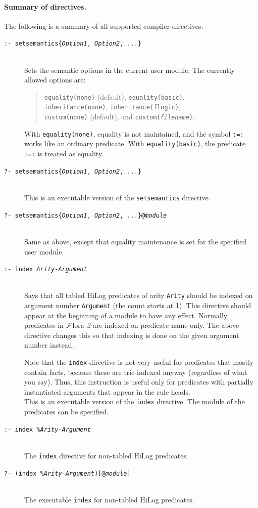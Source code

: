 \documentclass[11pt]{article}
\newcommand{\FLORA}{{\mbox{\sc ${\cal F}${lora}\rm\emph{-2}}}\xspace}
\begin{document}
\paragraph{Summary of directives.}
The following is a summary of all supported compiler directives:
\begin{description}
  \item[{\tt :- setsemantics\{\emph{Option1}, \emph{Option2}, ...\}}]
%
~~~\\
Sets the semantic options in the current user module.  The currently allowed
options are:
\begin{quote}
{\tt equality(none)} (default), {\tt equality(basic)},\\
{\tt inheritance(none)}, {\tt inheritance(flogic)},\\
{\tt custom(none)} (default), and {\tt custom(\emph{filename})}.
\end{quote}
  With {\tt equality(none)}, equality is not
maintained, and the symbol {\tt :=:} works like an ordinary predicate.
With {\tt equality(basic)}, the predicate {\tt :=:} is treated as equality.
\item[{\tt ?- setsemantics\{\emph{Option1}, \emph{Option2}, ...\}}]
  ~~~\\
  This is an executable version of the {\tt setsemantics} directive.
\item[{\tt ?- setsemantics\{\emph{Option1}, \emph{Option2}, ...\}@\emph{module}}]
  ~~~\\
  Same as above, except that equality maintenance is set for the specified
  user module.
  
\item[{\tt :- index \emph{Arity-Argument} }]
  ~~~\\
  Says that all tabled HiLog predicates of arity {\tt Arity} should be indexed on
  argument number {\tt Argument} (the count starts at 1). This directive
  should appear at the beginning of a module to have any effect.
  Normally predicates in \FLORA are indexed on predicate name only.
  The  above directive changes this so that indexing is done on the given
  argument number instead.

  Note that the {\tt index} directive is not very useful for predicates
  that mostly contain facts, because these are trie-indexed anyway
  (regardless of what you say). Thus, this instruction is useful only for
  predicates with partially instantiated arguments that appear in the rule
  heads.
~~~  \\
  This is an executable version of the {\tt index} directive.  The
  module of the predicates can be specified.
\item[{\tt :- index \emph{\%Arity-Argument} }]
~~~  \\
  The {\tt index} directive for non-tabled HiLog predicates.
\item[{\tt ?- (index \emph{\%Arity-Argument})[@\emph{module}] }]
~~~  \\
  The executable {\tt index} for non-tabled HiLog predicates.


\end{description}
\end{document}
